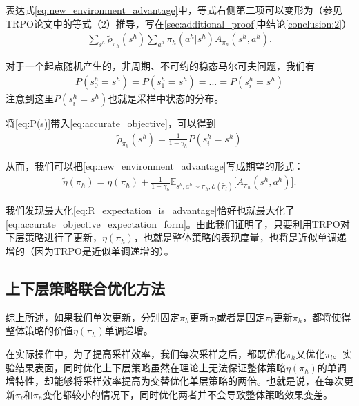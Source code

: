 表达式\eqref{eq:new_environment_advantage}中，等式右侧第二项可以变形为（参见TRPO论文中的等式（2）推导，写在\ref{sec:additional_proof}中结论\ref{conclusion:2}）
\begin{align}
  \sum_{s^h}\tilde{\rho}_{\pi_h}(s^h)\sum_{a^h}\pi_h(a^h|s^h)A_{\pi_h}(s^h,a^h).
  \label{eq:accurate_objective}
\end{align}

对于一个起点随机产生的，非周期、不可约的稳态马尔可夫问题，我们有
\begin{align}
  P(s_0^h = s^h) = P(s_1^h = s^h) = ... = P(s_i^h = s^h)
  \label{eq:P(s)}
\end{align}
注意到这里$P(s_i^h = s^h)$也就是采样中状态的分布。

将\eqref{eq:P(s)}带入\eqref{eq:accurate_objective}，可以得到
\begin{align}
  \tilde{\rho}_{\pi_h}(s^h) = \frac{1}{1-\gamma_h}P(s_i^h = s^h)
  \label{eq:rho_constant}
\end{align}

从而，我们可以把\eqref{eq:new_environment_advantage}写成期望的形式：
\begin{align}
  \tilde{\eta}(\pi_h) = \eta(\pi_h) + \frac{1}{1-\gamma_h}\mathbb{E}_{s^h, a^h \sim \pi_h, \mathcal{E}(\tilde{\pi_l})}\bigg[A_{\pi_h}(s^h, a^h)\bigg].
  \label{eq:accurate_objective_expectation_form}
\end{align}

我们发现最大化\eqref{eq:R_expectation_is_advantage}恰好也就最大化了\eqref{eq:accurate_objective_expectation_form}。由此我们证明了，只要利用TRPO对下层策略进行了更新，$\eta(\pi_h)$，也就是整体策略的表现度量，也将是近似单调递增的（因为TRPO是近似单调递增的）。

\subsection{上下层策略联合优化方法}
综上所述，如果我们单次更新，分别固定$\pi_h$更新$\pi_l$或者是固定$\pi_l$更新$\pi_h$，都将使得整体策略的价值$\eta(\pi_h)$单调递增。

在实际操作中，为了提高采样效率，我们每次采样之后，都既优化$\pi_h$又优化$\pi_l$。实验结果表面，同时优化上下层策略虽然在理论上无法保证整体策略$\eta(\pi_h)$的单调增特性，却能够将采样效率提高为交替优化单层策略的两倍。也就是说，在每次更新$\pi_l$和$\pi_h$变化都较小的情况下，同时优化两者并不会导致整体策略效果变差。


%
%
%
%
%
%
%
